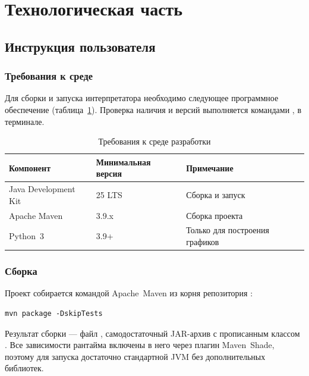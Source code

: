 \section{Технологическая часть}
\label{sec:tech}

\subsection{Инструкция пользователя}
\label{subsec:user-manual}

\subsubsection{Требования к среде}

Для сборки и запуска интерпретатора необходимо следующее программное обеспечение
(таблица~\ref{tab:requirements}). Проверка наличия и версий выполняется
командами ,  в терминале.

\begin{table}[!htb]
\caption{\centering Требования к среде разработки}
\label{tab:requirements}
\centering
\small
\begin{tabular}{@{}lll@{}}
\toprule
\textbf{Компонент} & \textbf{Минимальная версия} & \textbf{Примечание} \\
\midrule
Java Development Kit & 25 LTS & Сборка и запуск \\
Apache Maven & 3.9.x & Сборка проекта \\
Python~3 & 3.9+ & Только для построения графиков \\
\bottomrule
\end{tabular}
\end{table}

\subsubsection{Сборка}

Проект собирается командой Apache~Maven из корня репозитория :

\begin{longlisting}
\caption{Команда сборки}\label{lst:build}
\begin{verbatim}
mvn package -DskipTests
\end{verbatim}
\end{longlisting}

Результат сборки --- файл , самодостаточный
JAR-архив с прописанным классом .
Все зависимости рантайма включены в него через плагин Maven~Shade,
поэтому для запуска достаточно стандартной JVM без дополнительных библиотек.

